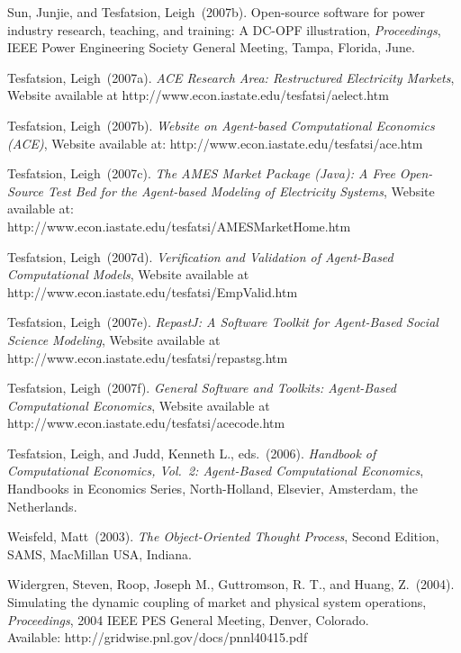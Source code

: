 \documentclass[12pt]{article}
\begin{document}
\begin{description}
\item Sun, Junjie, and Tesfatsion, Leigh~(2007b). Open-source software for power industry research, teaching, and training: A DC-OPF illustration, \textit{Proceedings\/}, IEEE Power Engineering Society General Meeting, Tampa, Florida, June.

\item Tesfatsion, Leigh~(2007a). \textit{ACE Research Area: Restructured Electricity Markets\/}, Website available at http://www.econ.iastate.edu/tesfatsi/aelect.htm

\item Tesfatsion, Leigh~(2007b). \textit{Website on Agent-based Computational Economics (ACE)\/}, Website available at: http://www.econ.iastate.edu/tesfatsi/ace.htm

\item Tesfatsion, Leigh~(2007c). \textit{The AMES Market Package (Java): A Free Open-Source Test Bed for the Agent-based Modeling of Electricity Systems\/}, Website available at:\\
http://www.econ.iastate.edu/tesfatsi/AMESMarketHome.htm

\item Tesfatsion, Leigh~(2007d). \textit{Verification and Validation of Agent-Based 
Computational Models\/}, Website available at http://www.econ.iastate.edu/tesfatsi/EmpValid.htm

\item Tesfatsion, Leigh~(2007e). \textit{RepastJ: A Software Toolkit for Agent-Based Social Science Modeling\/}, 
Website available at http://www.econ.iastate.edu/tesfatsi/repastsg.htm

\item Tesfatsion, Leigh~(2007f). \textit{General Software and Toolkits: Agent-Based Computational Economics\/}, 
Website available at http://www.econ.iastate.edu/tesfatsi/acecode.htm

\item Tesfatsion, Leigh, and Judd, Kenneth L., eds.~(2006). \textit{Handbook of 
Computational Economics, Vol.~2: Agent-Based Computational Economics\/}, Handbooks in 
Economics Series, North-Holland, Elsevier, Amsterdam, the Netherlands.

\item Weisfeld, Matt~(2003). \textit{The Object-Oriented Thought Process\/}, Second Edition, SAMS, MacMillan USA, Indiana.

\item Widergren, Steven, Roop, Joseph M., Guttromson, R. T., and Huang, Z.~(2004). Simulating the dynamic coupling of market and physical system operations, \textit{Proceedings\/}, 2004 IEEE PES General Meeting, Denver, Colorado.\\
Available: http://gridwise.pnl.gov/docs/pnnl40415.pdf


\end{description}
\end{document}

